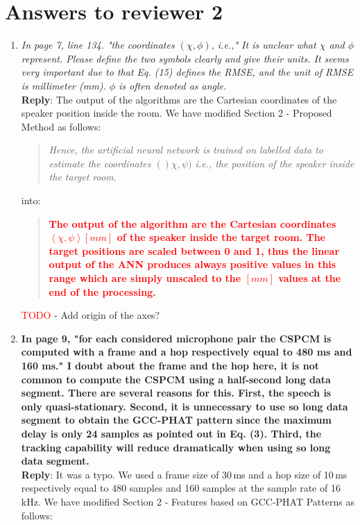 \documentclass[11pt, technote, letterpaper, oneside, onecolumn]{IEEEtran}
\begin{document}
\section{Answers to reviewer 2}\label{sec:rev2}
\begin{enumerate}
\item \textit{In page 7, line 134. "the coordinates $(\chi,\phi)$, i.e.," It is unclear what $\chi$ and $\phi$ represent. Please define the two symbols clearly and give their units. It seems very important due to that Eq. (15) defines the RMSE, and the unit of RMSE is millimeter (mm). $\phi$ is often denoted as angle.\\}
\textbf{Reply}:  The output of the algorithms are the Cartesian coordinates of the speaker position inside the room. We have modified Section 2 - Proposed Method as follows:
\begin{quote}
	\textit{Hence, the artificial neural network is trained on labelled data to estimate the coordinates $()\chi,\psi)$ i.e., the position of the speaker inside the target room.}
\end{quote}
into:
\begin{quote}
	\textcolor{red}{\textbf{The output of the algorithm are the Cartesian coordinates $\left \langle \chi,\psi \right \rangle \left [mm\right ]$ of the speaker inside the target room. The target positions are scaled between 0 and 1, thus the linear output of the ANN produces always positive values in this range which are simply unscaled to the $\left [mm\right ]$ values at the end of the processing.}}
\end{quote}
\textcolor{red}{TODO} - Add origin of the axes?

\item  \textbf{In page 9, "for each considered microphone pair the CSPCM is computed with a frame and a hop respectively equal to 480 ms and 160 ms." I doubt about the frame and the hop here, it is not common to compute the CSPCM using a half-second long data segment. There are several reasons for this. First, the speech is only quasi-stationary. Second, it is unnecessary to use so long data segment to obtain the GCC-PHAT pattern since the maximum delay is only 24 samples as pointed out in Eq. (3). Third, the tracking capability will reduce dramatically when using so long data segment.\\}
\textbf{Reply}:  It was a typo. We used a frame size of 30\,ms and a hop size of 10\,ms respectively equal to 480 samples and 160 samples at the sample rate of 16\,kHz. We have modified Section 2 - Features based on GCC-PHAT Patterns as follows:


\end{enumerate}
\end{document}

